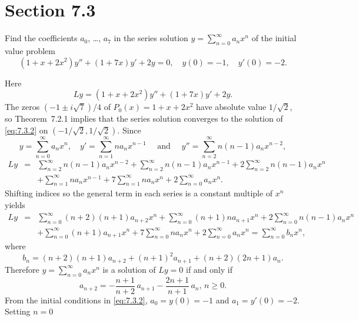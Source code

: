 \section*{Section 7.3}
\setcounter{chapter}{7}
\setcounter{section}{3}

\setcounter{example}{0}
\setcounter{equation}{1}
\begin{example}
  \label{example:7.3.1} \rm Find the coefficients $a_{0}$, \dots, $a_{7}$ in the series solution
  $y=\sum^{\infty}_{n=0}a_{n}x^{n}$ of the initial value problem
  \begin{equation}
    \label{eq:7.3.2}(1+x+2x^{2})y''+(1+7x)y'+2y=0,\quad y(0)=-1,\quad y'(0)=-2.
  \end{equation}
\end{example}
\setcounter{equation}{2}
\begin{examplesolution}
\solution Here
\[
  Ly=(1+x+2x^{2})y''+(1+7x)y'+2y.
\]
The zeros $(-1\pm i\sqrt{7})/4$ of $P_{0}(x)=1+x+2x^{2}$ have absolute value $1/\sqrt{2}$, so
Theorem~7.2.1 implies that the series solution converges to the solution of
\eqref{eq:7.3.2} on $(-1/\sqrt{2},1/\sqrt{2})$. Since
\[
  y=\sum^{\infty}_{n=0}a_{n}x^{n},\quad y'=\sum^{\infty}_{n=1}n a_{n}x^{n-1}\quad\mbox{ and }\quad y''=\sum^{\infty}_{n=2}n(n-1)a_{n}x^{n-2},
\]
\begin{eqnarray*}
  Ly & = & \sum^{\infty}_{n=2}n(n-1)a_{n}x^{n-2}+\sum^{\infty}_{n=2}n(n-1)a_{n}x^{n-1}+2\sum^{\infty}_{n=2}n(n-1)a_{n}x^{n} \\[10pt]
     &   & +\sum^{\infty}_{n=1}na_{n}x^{n-1}+7\sum^{\infty}_{n=1}na_{n}x^{n}+2\sum^{\infty}_{n=0}a_{n}x^{n}.
\end{eqnarray*}
Shifting indices so the general term in each series is a constant multiple of $x^{n}$ yields
\begin{eqnarray*}
  Ly & = & \sum^{\infty}_{n=0}(n+2)(n+1)a_{n+2}x^{n}+\sum^{\infty}_{n=0}(n+1)na_{n+1}x^{n}+2\sum^{\infty}_{n=0}n(n-1)a_{n}x^{n} \\[10pt]
     &   & +\sum^{\infty}_{n=0}(n+1)a_{n+1}x^{n}+7\sum^{\infty}_{n=0}na_{n}x^{n}+2\sum^{\infty}_{n=0}a_{n}x^{n}=\sum^{\infty}_{n=0}b_{n}x^{n},
\end{eqnarray*}
where
\[
  b_{n}=(n+2)(n+1)a_{n+2}+(n+1)^{2}a_{n+1}+(n+2)(2n+1)a_{n}.
\]
Therefore $y=\sum^{\infty}_{n=0}a_{n}x^{n}$ is a solution of $Ly=0$ if and only if
\begin{equation}
  \label{eq:7.3.3}a_{n+2}=-\frac{n+1}{n+2}\,a_{n+1}-\frac{2n+1}{n+1}\,a_{n},\,n\ge0.
\end{equation}
From the initial conditions in \eqref{eq:7.3.2}, $a_{0}=y(0)=-1$ and $a_{1}=y'(0)=-2$. Setting $n=0$

\end{examplesolution}
